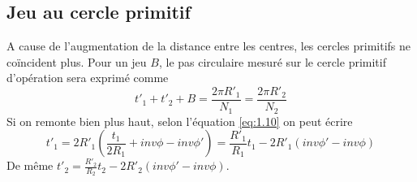 	\subsection{Jeu au cercle primitif}
		A cause de l'augmentation de la distance entre les centres, les cercles primitifs ne coïncident plus. Pour un jeu $B$, le pas circulaire mesuré sur le cercle primitif d'opération sera exprimé comme
		\begin{equation}
			t'_1 + t'_2 + B = \frac{2\pi R'_1}{N_1} = \frac{2\pi R'_2}{N_2}
		\end{equation}
		Si on remonte bien plus haut, selon l'équation \autoref{eq:1.10} on peut écrire
		\begin{equation}
			t'_1 = 2R'_1\left( \frac{t_1}{2R_1} + inv \phi - inv \phi ' \right) = \frac{R'_1}{R_1} t_1 - 2R'_1(inv\phi ' - inv \phi)
		\end{equation}
		De même $t'_2 = \frac{R'_2}{R_2} t_2 - 2R'_2(inv\phi ' - inv \phi)$. 